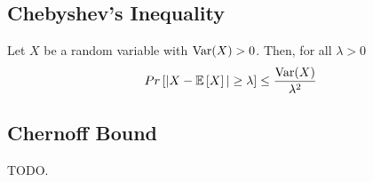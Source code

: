 \documentclass[10pt,a4paper]{article}
\begin{document}
\subsection*{Chebyshev's Inequality}

Let $X$ be a random variable with $\text{Var}(X) > 0$. Then, for all $\lambda > 0$
\begin{align*}
    Pr \left[ |X - \mathbb{E}\left[X\right]| \geq \lambda \right] \leq \dfrac{\text{Var}(X)}{\lambda^2}
\end{align*}

\subsection*{Chernoff Bound}

TODO.



\end{document}
